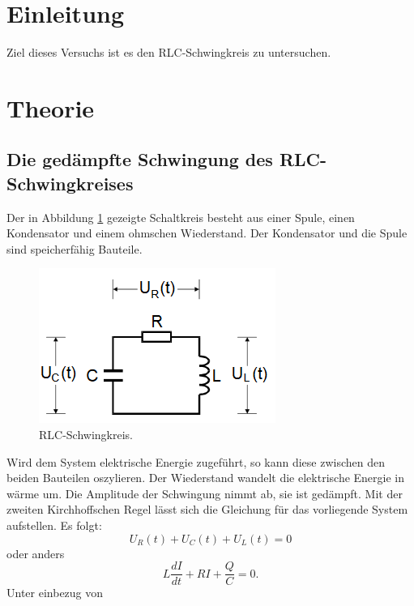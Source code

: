 \section{Einleitung}
Ziel dieses Versuchs ist es den RLC-Schwingkreis zu untersuchen.
\section{Theorie}
\label{sec:Theorie}
\subsection{Die gedämpfte Schwingung des RLC-Schwingkreises}
Der in Abbildung \ref{fig:rlc} gezeigte Schaltkreis besteht aus einer Spule, einen Kondensator und einem ohmschen Wiederstand.
Der Kondensator und die Spule sind speicherfähig Bauteile.
\begin{figure}[H]
    \centering
    \caption{RLC-Schwingkreis.\cite{v354}}
    \label{fig:rlc}
    \includegraphics[width=\textwidth-20em]{content/RLCKreis.png}
\end{figure}
\noindent
Wird dem System elektrische Energie zugeführt, so kann diese zwischen den beiden Bauteilen oszylieren.
Der Wiederstand wandelt die elektrische Energie in wärme um.
Die Amplitude der Schwingung nimmt ab, sie ist gedämpft.
Mit der zweiten Kirchhoffschen Regel lässt sich die Gleichung für das vorliegende System aufstellen.
Es folgt:
\begin{equation}
  U_R(t)+U_C(t)+U_L(t) = 0
\end{equation}
oder anders
\begin{equation}
  \label{eq:gl1}
  L\frac{dI}{dt}+RI+\frac{Q}{C}=0 .
\end{equation}
Unter einbezug von
